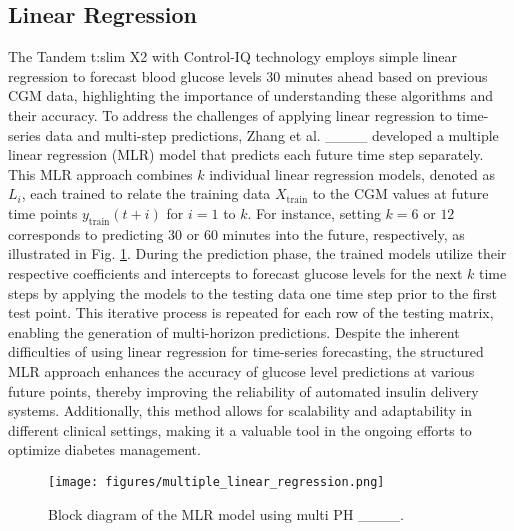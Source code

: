 \subsection{Linear Regression}
The Tandem t:slim X2 with Control-IQ technology employs simple linear regression to forecast blood glucose levels 30 minutes ahead based on previous CGM data, highlighting the importance of understanding these algorithms and their accuracy. To address the challenges of applying linear regression to time-series data and multi-step predictions, Zhang et al. ____ developed a multiple linear regression (MLR) model that predicts each future time step separately. This MLR approach combines \( k \) individual linear regression models, denoted as \( L_i \), each trained to relate the training data \( X_{\text{train}} \) to the CGM values at future time points \( y_{\text{train}}(t + i) \) for \( i = 1 \) to \( k \). For instance, setting \( k = 6 \) or \( 12 \) corresponds to predicting 30 or 60 minutes into the future, respectively, as illustrated in Fig. \ref{fig:multiple_linear_regression}. During the prediction phase, the trained models utilize their respective coefficients and intercepts to forecast glucose levels for the next \( k \) time steps by applying the models to the testing data one time step prior to the first test point. This iterative process is repeated for each row of the testing matrix, enabling the generation of multi-horizon predictions. Despite the inherent difficulties of using linear regression for time-series forecasting, the structured MLR approach enhances the accuracy of glucose level predictions at various future points, thereby improving the reliability of automated insulin delivery systems. Additionally, this method allows for scalability and adaptability in different clinical settings, making it a valuable tool in the ongoing efforts to optimize diabetes management.

\begin{figure}[tb]
\centerline{\texttt{[image: figures/multiple\_linear\_regression.png]}}
\caption{Block diagram of the MLR model using multi PH ____.}
\label{fig:multiple_linear_regression}
\end{figure}